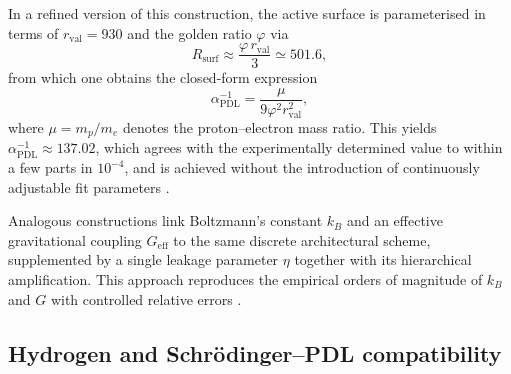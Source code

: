 \documentclass[11pt,a4paper]{article}
\theoremstyle{definition}
\newcommand{\Geff}{G_{\mathrm{eff}}}
\newcommand{\alphaPDL}{\alpha_{\mathrm{PDL}}}
\newcommand{\etaL}{\eta} %
\begin{document}
In a refined version of this construction, the active surface is parameterised in terms of $r_{\text{val}} = 930$ and the golden ratio $\varphi$ via
\[
R_{\text{surf}} \approx \frac{\varphi\, r_{\text{val}}}{3} \simeq 501.6,
\]
from which one obtains the closed-form expression
\[
\alphaPDL^{-1} = \frac{\mu}{9 \varphi^2 r_{\text{val}}^2},
\]
where $\mu = m_p/m_e$ denotes the proton–electron mass ratio. This yields $\alphaPDL^{-1} \approx 137.02$, which agrees with the experimentally determined value to within a few parts in $10^{-4}$, and is achieved without the introduction of continuously adjustable fit parameters \cite{Derivation_alpha_PDL,Relational_Emergence_of_Born_s_Rule_and_a_Golden_Ratio_Active_Surface_in_PDL,PDL_Global_Mapping_Structures_Results_Open_Problems}. 

Analogous constructions link Boltzmann’s constant $k_B$ and an effective gravitational coupling $\Geff$ to the same discrete architectural scheme, supplemented by a single leakage parameter $\etaL$ together with its hierarchical amplification. This approach reproduces the empirical orders of magnitude of $k_B$ and $G$ with controlled relative errors \cite{PDL,A_Topological_Reformulation_in_the_Projective_Dynamic_Logo_Framework_Hierarchical_Coherence_Filtering_and_the_Exponent_18_in_PDL,Hierarchical_Coherence_Filtering_and_the_Exponent_18_in_PDL,PDL_Global_Mapping_Structures_Results_Open_Problems}.

\subsection{Hydrogen and Schr\"odinger--PDL compatibility}
\end{document}
